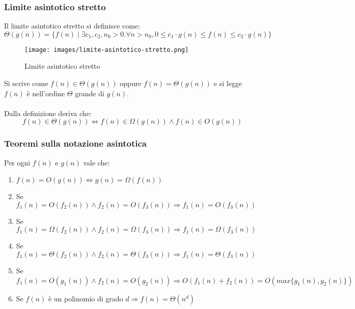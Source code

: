 \subsubsection{Limite asintotico stretto}
\begin{definition}
	Il limite asintotico stretto si definisce come:
	\begin{equation}
		\Theta(g(n)) = \{f(n) \mid \exists c_1, c_2, n_0 > 0 . \forall n > n_0, 0 \leq c_1 \cdot g(n) \leq f(n) \leq c_2 \cdot g(n) \}
	\end{equation}
\end{definition}
\begin{wrapfigure}[5]{l}{8cm}
	\vspace{-10pt}
	\centering
	\texttt{[image: images/limite-asintotico-stretto.png]}
	\vspace{-5pt}
	\caption{Limite asintotico stretto}
\end{wrapfigure}
Si scrive come $f(n) \in \Theta(g(n))$ oppure $f(n) = \Theta(g(n))$ e si legge $f(n)$ è nell'ordine $\Theta$ grande di $g(n)$.\\\\

\vspace{55pt}
Dalla definizione deriva che:
\begin{equation}
	f(n) \in \Theta(g(n)) \Longleftrightarrow f(n) \in \Omega(g(n)) \land f(n) \in O(g(n))
\end{equation}

\subsubsection{Teoremi sulla notazione asintotica}
\begin{theorem}
	Per ogni $f(n)$ e $g(n)$ vale che:
	\begin{enumerate}
		\item $f(n) = O(g(n)) \Longleftrightarrow g(n) = \Omega(f(n))$
		\item Se $f_1(n) = O(f_2(n)) \land f_2(n) = O(f_3(n)) \Longrightarrow f_1(n) = O(f_3(n))$
		\item Se $f_1(n) = \Omega(f_2(n)) \land f_2(n) = \Omega(f_3(n)) \Longrightarrow f_1(n) = \Omega(f_3(n))$
		\item Se $f_1(n) = \Theta(f_2(n)) \land f_2(n) = \Theta(f_3(n)) \Longrightarrow f_1(n) = \Theta(f_3(n))$
		\item Se $f_1(n) = O(g_1(n)) \land f_2(n) = O(g_2(n)) \Longrightarrow O(f_1(n) + f_2(n)) = O(max\{g_1(n),g_2(n)\})$
		\item Se $f(n)$ è un polinomio di grado $d \Longrightarrow f(n) = \Theta(n^d)$
	\end{enumerate}
\end{theorem}

